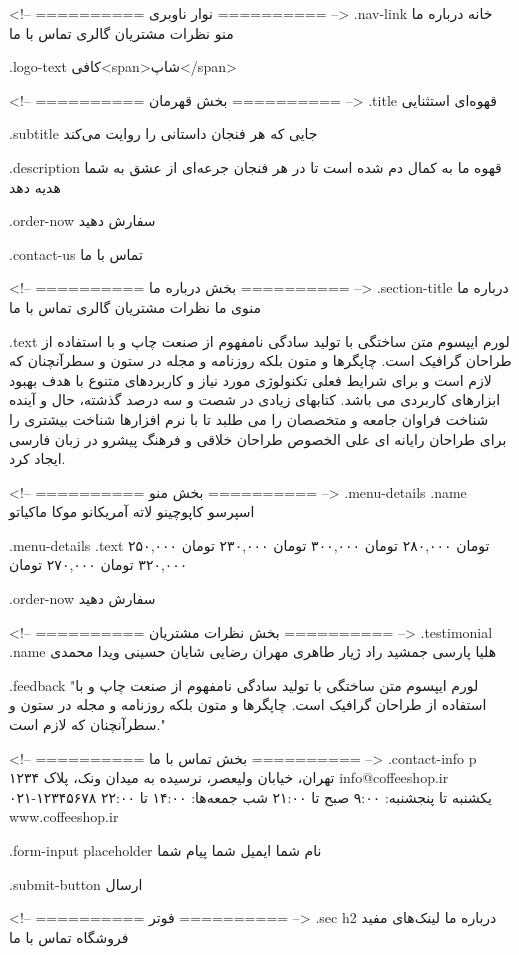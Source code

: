 <!-- ========== نوار ناوبری ========== -->
.nav-link
خانه
درباره ما
منو
نظرات مشتریان
گالری
تماس با ما

.logo-text
کافی‌<span>شاپ</span>

<!-- ========== بخش قهرمان ========== -->
.title
قهوه‌ای استثنایی

.subtitle
جایی که هر فنجان داستانی را روایت می‌کند

.description
قهوه ما به کمال دم شده است تا در هر فنجان جرعه‌ای از عشق به شما هدیه دهد

.order-now
سفارش دهید

.contact-us
تماس با ما

<!-- ========== بخش درباره ما ========== -->
.section-title
درباره ما
منوی ما
نظرات مشتریان
گالری
تماس با ما

.text
لورم ایپسوم متن ساختگی با تولید سادگی نامفهوم از صنعت چاپ و با استفاده از طراحان گرافیک است. چاپگرها و متون بلکه روزنامه و مجله در ستون و سطرآنچنان که لازم است و برای شرایط فعلی تکنولوژی مورد نیاز و کاربردهای متنوع با هدف بهبود ابزارهای کاربردی می باشد. کتابهای زیادی در شصت و سه درصد گذشته، حال و آینده شناخت فراوان جامعه و متخصصان را می طلبد تا با نرم افزارها شناخت بیشتری را برای طراحان رایانه ای علی الخصوص طراحان خلاقی و فرهنگ پیشرو در زبان فارسی ایجاد کرد.

<!-- ========== بخش منو ========== -->
.menu-details .name
اسپرسو
کاپوچینو
لاته
آمریکانو
موکا
ماکیاتو

.menu-details .text
۲۵۰,۰۰۰ تومان
۲۸۰,۰۰۰ تومان
۳۰۰,۰۰۰ تومان
۲۳۰,۰۰۰ تومان
۳۲۰,۰۰۰ تومان
۲۷۰,۰۰۰ تومان

.order-now
سفارش دهید

<!-- ========== بخش نظرات مشتریان ========== -->
.testimonial .name
هلیا پارسی
جمشید راد
ژیار طاهری
مهران رضایی
شایان حسینی
ویدا محمدی

.feedback
"لورم ایپسوم متن ساختگی با تولید سادگی نامفهوم از صنعت چاپ و با استفاده از طراحان گرافیک است. چاپگرها و متون بلکه روزنامه و مجله در ستون و سطرآنچنان که لازم است."

<!-- ========== بخش تماس با ما ========== -->
.contact-info p
تهران، خیابان ولیعصر، نرسیده به میدان ونک، پلاک ۱۲۳۴
info@coffeeshop.ir
۰۲۱-۱۲۳۴۵۶۷۸
یکشنبه تا پنجشنبه: ۹:۰۰ صبح تا ۲۱:۰۰ شب
جمعه‌ها: ۱۴:۰۰ تا ۲۲:۰۰
www.coffeeshop.ir

.form-input placeholder
نام شما
ایمیل شما
پیام شما

.submit-button
ارسال

<!-- ========== فوتر ========== -->
.sec h2
درباره ما
لینک‌های مفید
فروشگاه
تماس با ما

